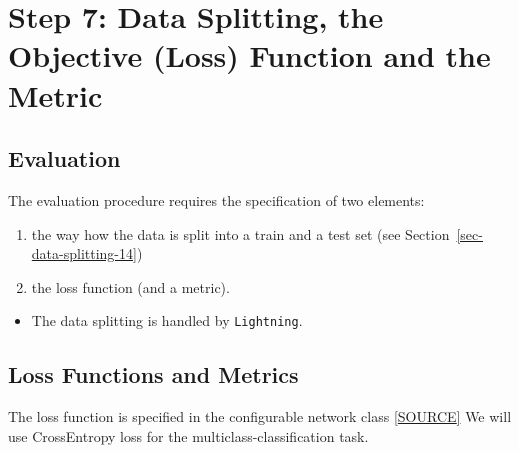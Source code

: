 \documentclass[
  letterpaper,
  DIV=11,
  numbers=noendperiod]{scrreprt}
\providecommand{\tightlist}{%
  \setlength{\itemsep}{0pt}\setlength{\parskip}{0pt}}\usepackage{longtable,booktabs,array}
\begin{document}
\hypertarget{step-7-data-splitting-the-objective-loss-function-and-the-metric}{%
\section{Step 7: Data Splitting, the Objective (Loss) Function and the
Metric}\label{step-7-data-splitting-the-objective-loss-function-and-the-metric}}

\hypertarget{sec-selection-of-target-function-31}{%
\subsection{Evaluation}\label{sec-selection-of-target-function-31}}

The evaluation procedure requires the specification of two elements:

\begin{enumerate}
\def\labelenumi{\arabic{enumi}.}
\tightlist
\item
  the way how the data is split into a train and a test set (see
  Section~\ref{sec-data-splitting-14})
\item
  the loss function (and a metric).
\end{enumerate}

\begin{tcolorbox}[enhanced jigsaw, left=2mm, title=\textcolor{quarto-callout-caution-color}{\faFire}\hspace{0.5em}{Caution: Data Splitting in Lightning}, titlerule=0mm, toprule=.15mm, leftrule=.75mm, colbacktitle=quarto-callout-caution-color!10!white, colback=white, arc=.35mm, toptitle=1mm, bottomtitle=1mm, colframe=quarto-callout-caution-color-frame, bottomrule=.15mm, rightrule=.15mm, breakable, coltitle=black, opacitybacktitle=0.6, opacityback=0]

\begin{itemize}
\tightlist
\item
  The data splitting is handled by \texttt{Lightning}.
\end{itemize}

\end{tcolorbox}

\hypertarget{sec-loss-functions-and-metrics-31}{%
\subsection{Loss Functions and
Metrics}\label{sec-loss-functions-and-metrics-31}}

The loss function is specified in the configurable network class
\href{https://github.com/sequential-parameter-optimization/spotPython/blob/main/src/spotPython/light/netlightbase.py}{{[}SOURCE{]}}
We will use CrossEntropy loss for the multiclass-classification task.
\end{document}
